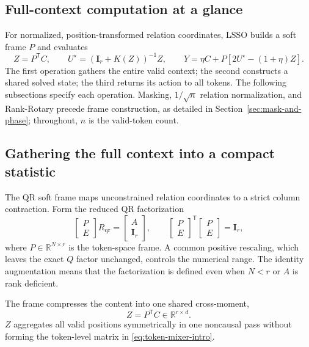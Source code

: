 \documentclass[10pt]{article}
\newcommand{\R}{\mathbb{R}}
\newcommand{\I}{\mathbf{I}}
\newcommand{\T}{\mathsf{T}}
\begin{document}
\subsection{Full-context computation at a glance}
For normalized, position-transformed relation coordinates, LSSO builds a soft
frame $P$ and evaluates
\begin{equation}
 Z=P^\T C,\qquad U^\star=(\I_r+K(Z))^{-1}Z,\qquad
 Y=\eta C+P[2U^\star-(1+\eta)Z].
\label{eq:computation-overview}
\end{equation}
The first operation gathers the entire valid context; the second constructs a
shared solved state; the third returns its action to all tokens.  The following
subsections specify each operation.  Masking, $1/\sqrt n$ relation normalization,
and Rank-Rotary precede frame construction, as detailed in
Section~\ref{sec:mask-and-phase}; throughout, $n$ is the valid-token count.


\subsection{Gathering the full context into a compact statistic}
\label{sec:soft-frame}

The QR soft frame maps unconstrained relation coordinates to a strict column
contraction.  Form the reduced QR factorization
\begin{equation}
    \begin{bmatrix}P\\E\end{bmatrix}R_{\mathrm{qr}}
    =
    \begin{bmatrix}A\\\I_r\end{bmatrix},
    \qquad
    \begin{bmatrix}P\\E\end{bmatrix}^{\!\T}
    \begin{bmatrix}P\\E\end{bmatrix}=\I_r,
\label{eq:soft-frame}
\end{equation}
where $P\in\R^{N\times r}$ is the token-space frame.  A common positive
rescaling, which leaves the exact $Q$ factor unchanged, controls the numerical
range.
The identity augmentation means that the factorization is defined even when
$N<r$ or $A$ is rank deficient.

The frame compresses the content into one shared cross-moment,
\begin{equation}
    Z=P^\T C\in\R^{r\times d}.
\label{eq:cross-moment}
\end{equation}
$Z$ aggregates all valid positions symmetrically in one noncausal pass without
forming the token-level matrix in \eqref{eq:token-mixer-intro}.
\end{document}

